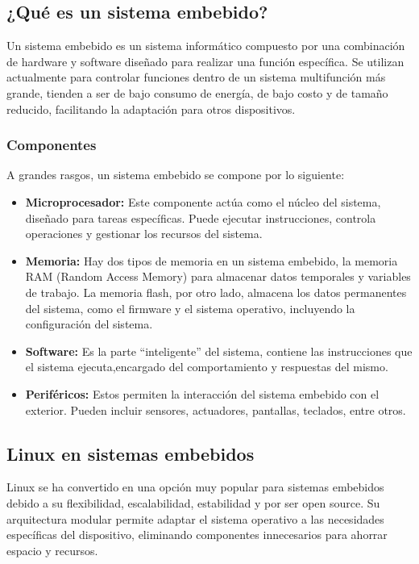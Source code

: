 \documentclass[12pt, letterpaper]{article}
\begin{document}
	\subsection{¿Qué es un sistema embebido?}

	Un sistema embebido es un sistema informático compuesto por una combinación de hardware y software diseñado para realizar una función específica. Se utilizan actualmente para controlar funciones dentro de un sistema multifunción más grande, tienden a ser de bajo consumo de energía, de bajo costo y de tamaño reducido, facilitando la adaptación para otros dispositivos.

	\subsubsection{Componentes}

	A grandes rasgos, un sistema embebido se compone por lo siguiente:

	\begin{itemize}
		\item \textbf{Microprocesador:} Este componente actúa como el núcleo del sistema, diseñado para tareas específicas. Puede ejecutar instrucciones, controla operaciones y gestionar los recursos del sistema.
		\item \textbf{Memoria:} Hay dos tipos de memoria en un sistema embebido, la memoria RAM (Random Access Memory) para almacenar datos temporales y variables de trabajo. La memoria flash, por otro lado, almacena los datos permanentes del sistema, como el firmware y el sistema operativo, incluyendo la configuración del sistema.
		\item \textbf{Software:} Es la parte ``inteligente'' del sistema, contiene las instrucciones que el sistema ejecuta,encargado del comportamiento y respuestas del mismo.
		\item \textbf{Periféricos:} Estos permiten la interacción del sistema embebido con el exterior. Pueden incluir sensores, actuadores, pantallas, teclados, entre otros.
	\end{itemize}

	\subsection{Linux en sistemas embebidos}

	Linux se ha convertido en una opción muy popular para sistemas embebidos debido a su flexibilidad, escalabilidad, estabilidad y por ser open source. Su arquitectura modular permite adaptar el sistema operativo a las necesidades específicas del dispositivo, eliminando componentes innecesarios para ahorrar espacio y recursos.
\end{document}
